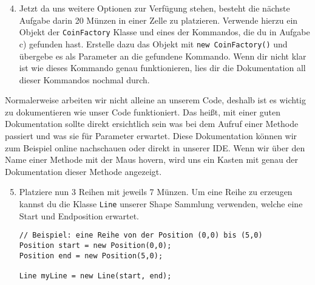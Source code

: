 \begin{enumerate} \setcounter{enumi}{3}
    \item Jetzt da uns weitere Optionen zur Verfügung stehen, besteht die nächste Aufgabe darin 20 Münzen in einer Zelle zu platzieren. Verwende hierzu ein Objekt der \texttt{CoinFactory} Klasse und eines der Kommandos, die du in Aufgabe c) gefunden hast. Erstelle dazu das Objekt mit \texttt{new CoinFactory()} und übergebe es als Parameter an die gefundene Kommando. Wenn dir nicht klar ist wie dieses Kommando genau funktionieren, lies dir die Dokumentation all dieser Kommandos nochmal durch.

\end{enumerate}

\begin{Infobox}
    Normalerweise arbeiten wir nicht alleine an unserem Code, deshalb ist es wichtig zu dokumentieren wie unser Code funktioniert. Das heißt, mit einer guten Dokumentation sollte direkt ersichtlich sein was bei dem Aufruf einer Methode passiert und was sie für Parameter erwartet. Diese Dokumentation können wir zum Beispiel online nachschauen oder direkt in unserer IDE. Wenn wir über den Name einer Methode mit der Maus hovern, wird uns ein Kasten mit genau der Dokumentation dieser Methode angezeigt.
\end{Infobox}


\begin{enumerate} \setcounter{enumi}{4}
    \item Platziere nun 3 Reihen mit jeweils 7 Münzen. Um eine Reihe zu erzeugen kannst du die Klasse \texttt{Line} unserer Shape Sammlung verwenden, welche eine Start und Endposition erwartet.

    \begin{lstlisting}
// Beispiel: eine Reihe von der Position (0,0) bis (5,0)
Position start = new Position(0,0);
Position end = new Position(5,0);

Line myLine = new Line(start, end);
    \end{lstlisting}

\end{enumerate}
